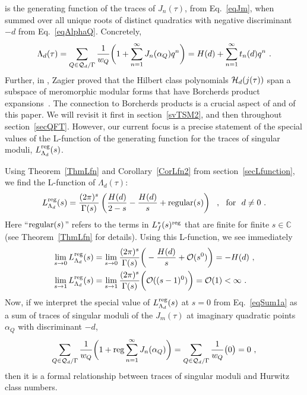\documentclass[11pt,a4paper]{article}
\newcommand{\G}{\Gamma}
\def\C{\mathbb{C}}
\newcommand{\reg}{{\rm reg}}
\begin{document}
is the generating function of the traces of $J_n(\tau)$, from Eq.~\eqref{eqJm}, when summed over all unique roots of distinct quadratics with negative discriminant $-d$ from Eq.~\eqref{eqAlphaQ}. Concretely,
\begin{align}
\Lambda_d(\tau)
= \sum_{Q \in {\cal Q}_d/\G} \frac{1}{w_Q} \bigg(1 + \sum_{n = 1}^{\infty} J_n(\alpha_Q) q^n \bigg)
= H(d) + \sum_{n = 1}^{\infty} t_n(d) q^n~. \label{eqLambdaD}
\end{align}
Further, in \cite{02-TSM}, Zagier proved that the Hilbert class polynomials ${\cal H}_d(j(\tau))$ span a subspace of meromorphic modular forms that have Borcherds product expansions~\cite{25-Bor1994}. The connection to Borcherds products is a crucial aspect of \cite{02-TSM} and of this paper. We will revisit it first in section~\ref{svTSM2}, and then throughout section~\ref{secQFT}. However, our current focus is a precise statement of the special values of the L-function of the generating function for the traces of singular moduli, $L_{\Lambda_d}^\reg(s)$.

Using Theorem~\ref{ThmLfn} and Corollary~\ref{CorLfn2} from section~\ref{secLfunction}, we find the L-function of $\Lambda_d(\tau)$:
\begin{align}
L_{\Lambda_d}^\reg(s) = \frac{(2 \pi)^s}{\G(s)} \left( \frac{H(d)}{2-s}- \frac{H(d)}{s} + {\rm regular}(s) \right) ~~,~~{\rm for} ~~d \neq 0~.
\end{align}
Here ``${\rm regular}(s)$'' refers to the terms in $L_f^*(s)^\reg$ that are finite for finite $s \in \C$ (see Theorem~\ref{ThmLfn} for details). Using this L-function, we see immediately 
\begin{align}
\lim_{s \to 0} L_{\Lambda_d}^\reg(s) &= \lim_{s \to 0} \frac{(2 \pi)^s}{\G(s)}\bigg( -\frac{H(d)}{s} + {\cal O}(s^0) \bigg) = -H(d)~,\label{eqSum1a}\\
\lim_{s \to 1} L_{\Lambda_d}^\reg(s) &= \lim_{s \to 1} \frac{(2 \pi)^s}{\G(s)}\bigg( {\cal O}((s-1)^0) \bigg) = {\cal O}(1) < \infty~. \label{eqSum1b}
\end{align}
Now, if we interpret the special value of $L_{\Lambda_d}^\reg(s)$ at $s = 0$ from Eq.~\eqref{eqSum1a} as a sum of traces of singular moduli of the $J_m(\tau)$ at imaginary quadratic points $\alpha_Q$ with discriminant $-d$, 
\begin{align}
\sum_{Q \in {\cal Q}_d/\G} \frac{1}{w_Q} \bigg( 1 + \reg\sum_{n = 1}^{\infty} J_n(\alpha_Q)\bigg) = \sum_{Q \in {\cal Q}_d/\G} \frac{1}{w_Q} \big( 0 \big) = 0~,\label{eqCool1}
\end{align}
then it is a formal relationship between traces of singular moduli and Hurwitz class numbers. 
\end{document}
